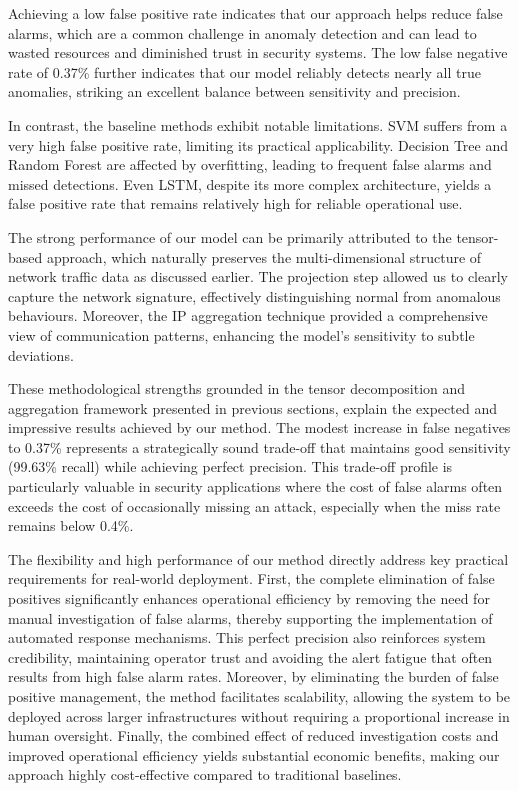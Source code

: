 \documentclass{ieeeaccess}
\begin{document}
Achieving a low false positive rate indicates that our approach helps reduce false alarms, which are a common challenge in anomaly detection and can lead to wasted resources and diminished trust in security systems. The low false negative rate of 0.37\% further indicates that our model reliably detects nearly all true anomalies, striking an excellent balance between sensitivity and precision.

In contrast, the baseline methods exhibit notable limitations. SVM suffers from a very high false positive rate, limiting its practical applicability. Decision Tree and Random Forest are affected by overfitting, leading to frequent false alarms and missed detections. Even LSTM, despite its more complex architecture, yields a false positive rate that remains relatively high for reliable operational use.

 The strong performance of our model can be primarily attributed to the tensor-based approach, which naturally preserves the multi-dimensional structure of network traffic data as discussed earlier. The projection step allowed us to clearly capture the network signature, effectively distinguishing normal from anomalous behaviours. Moreover, the IP aggregation technique provided a comprehensive view of communication patterns, enhancing the model’s sensitivity to subtle deviations. 
 
 These methodological strengths grounded in the tensor decomposition and aggregation framework presented in previous sections, explain the expected and impressive results achieved by our method. The modest increase in false negatives to 0.37\% represents a strategically sound trade-off that maintains good sensitivity (99.63\% recall) while achieving perfect precision. This trade-off profile is particularly valuable in security applications where the cost of false alarms often exceeds the cost of occasionally missing an attack, especially when the miss rate remains below 0.4\%.


The flexibility and high performance of our method directly address key practical requirements for real-world deployment. First, the complete elimination of false positives significantly enhances operational efficiency by removing the need for manual investigation of false alarms, thereby supporting the implementation of automated response mechanisms. This perfect precision also reinforces system credibility, maintaining operator trust and avoiding the alert fatigue that often results from high false alarm rates. Moreover, by eliminating the burden of false positive management, the method facilitates scalability, allowing the system to be deployed across larger infrastructures without requiring a proportional increase in human oversight. Finally, the combined effect of reduced investigation costs and improved operational efficiency yields substantial economic benefits, making our approach highly cost-effective compared to traditional baselines.
\end{document}
